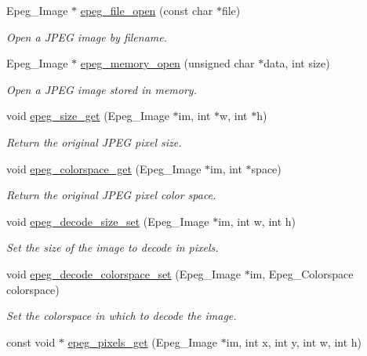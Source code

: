\begin{DoxyCompactItemize}
\item 
Epeg\+\_\+\+Image $\ast$ \hyperlink{epeg_8c_ac046eceb33af487e670a6b18d15ccae7}{epeg\+\_\+file\+\_\+open} (const char $\ast$file)
\begin{DoxyCompactList}\small\item\em Open a J\+P\+E\+G image by filename. \end{DoxyCompactList}\item 
Epeg\+\_\+\+Image $\ast$ \hyperlink{epeg_8c_a9df9756f2e34e67701e7d88bcb43fd16}{epeg\+\_\+memory\+\_\+open} (unsigned char $\ast$data, int size)
\begin{DoxyCompactList}\small\item\em Open a J\+P\+E\+G image stored in memory. \end{DoxyCompactList}\item 
void \hyperlink{epeg_8c_a3b8680bdbf470d1a634618e5308ce147}{epeg\+\_\+size\+\_\+get} (Epeg\+\_\+\+Image $\ast$im, int $\ast$w, int $\ast$h)
\begin{DoxyCompactList}\small\item\em Return the original J\+P\+E\+G pixel size. \end{DoxyCompactList}\item 
void \hyperlink{epeg_8c_a290a722dddc53761d213524ce0e89284}{epeg\+\_\+colorspace\+\_\+get} (Epeg\+\_\+\+Image $\ast$im, int $\ast$space)
\begin{DoxyCompactList}\small\item\em Return the original J\+P\+E\+G pixel color space. \end{DoxyCompactList}\item 
void \hyperlink{epeg_8c_a800dc04316740427b1f4366d973ff4e4}{epeg\+\_\+decode\+\_\+size\+\_\+set} (Epeg\+\_\+\+Image $\ast$im, int w, int h)
\begin{DoxyCompactList}\small\item\em Set the size of the image to decode in pixels. \end{DoxyCompactList}\item 
void \hyperlink{epeg_8c_afe41e06c6667542ad4685730538e03f7}{epeg\+\_\+decode\+\_\+colorspace\+\_\+set} (Epeg\+\_\+\+Image $\ast$im, Epeg\+\_\+\+Colorspace colorspace)
\begin{DoxyCompactList}\small\item\em Set the colorspace in which to decode the image. \end{DoxyCompactList}\item 
const void $\ast$ \hyperlink{epeg_8c_aa3e359181a6a48bd84708828364bf094}{epeg\+\_\+pixels\+\_\+get} (Epeg\+\_\+\+Image $\ast$im, int x, int y, int w, int h)

\end{DoxyCompactItemize}
